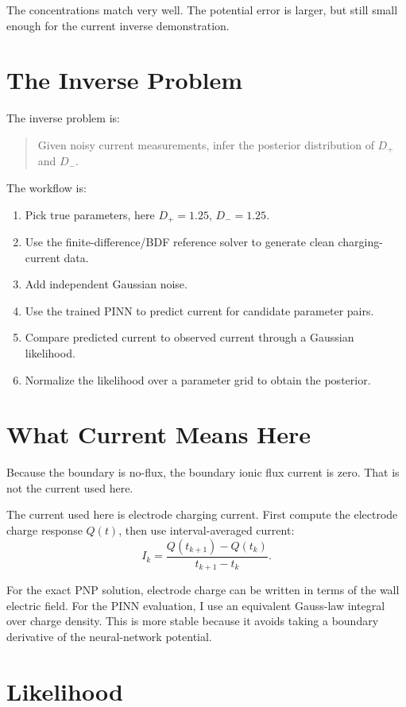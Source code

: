 \documentclass[11pt]{article}
\newcommand{\Dp}{D_{+}}
\newcommand{\Dn}{D_{-}}
\begin{document}
The concentrations match very well. The potential error is larger, but still
small enough for the current inverse demonstration.

\section*{The Inverse Problem}

The inverse problem is:

\begin{quote}
Given noisy current measurements, infer the posterior distribution of
$\Dp$ and $\Dn$.
\end{quote}

The workflow is:

\begin{enumerate}
  \item Pick true parameters, here $\Dp=1.25$, $\Dn=1.25$.
  \item Use the finite-difference/BDF reference solver to generate clean
        charging-current data.
  \item Add independent Gaussian noise.
  \item Use the trained PINN to predict current for candidate parameter pairs.
  \item Compare predicted current to observed current through a Gaussian
        likelihood.
  \item Normalize the likelihood over a parameter grid to obtain the posterior.
\end{enumerate}

\section*{What Current Means Here}

Because the boundary is no-flux, the boundary ionic flux current is zero. That
is not the current used here.

The current used here is electrode charging current. First compute the electrode
charge response $Q(t)$, then use interval-averaged current:
\[
  I_k = \frac{Q(t_{k+1})-Q(t_k)}{t_{k+1}-t_k}.
\]

For the exact PNP solution, electrode charge can be written in terms of the wall
electric field. For the PINN evaluation, I use an equivalent Gauss-law integral
over charge density. This is more stable because it avoids taking a boundary
derivative of the neural-network potential.

\section*{Likelihood}
\end{document}

